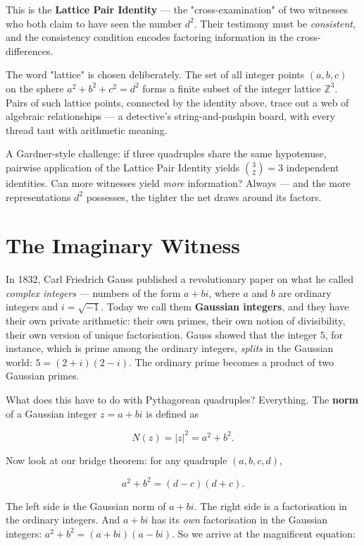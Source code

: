 \documentclass[11pt,twoside,openright]{book}
\theoremstyle{definition}
\theoremstyle{remark}
\begin{document}
This is the \textbf{Lattice Pair Identity} --- the "cross-examination" of two witnesses who both claim to have seen the number $d^2$. Their testimony must be \textit{consistent}, and the consistency condition encodes factoring information in the cross-differences.

The word "lattice" is chosen deliberately. The set of all integer points $(a, b, c)$ on the sphere $a^2 + b^2 + c^2 = d^2$ forms a finite subset of the integer lattice $\mathbb{Z}^3$. Pairs of such lattice points, connected by the identity above, trace out a web of algebraic relationships --- a detective's string-and-pushpin board, with every thread taut with arithmetic meaning.

A Gardner-style challenge: if three quadruples share the same hypotenuse, pairwise application of the Lattice Pair Identity yields $\binom{3}{2} = 3$ independent identities. Can more witnesses yield \textit{more} information? Always --- and the more representations $d^2$ possesses, the tighter the net draws around its factors.



\section{The Imaginary Witness}

In 1832, Carl Friedrich Gauss published a revolutionary paper on what he called \textit{complex integers} --- numbers of the form $a + bi$, where $a$ and $b$ are ordinary integers and $i = \sqrt{-1}$. Today we call them \textbf{Gaussian integers}, and they have their own private arithmetic: their own primes, their own notion of divisibility, their own version of unique factorisation. Gauss showed that the integer $5$, for instance, which is prime among the ordinary integers, \textit{splits} in the Gaussian world: $5 = (2 + i)(2 - i)$. The ordinary prime becomes a product of two Gaussian primes.

What does this have to do with Pythagorean quadruples? Everything. The \textbf{norm} of a Gaussian integer $z = a + bi$ is defined as

\[N(z) = |z|^2 = a^2 + b^2.\]

Now look at our bridge theorem: for any quadruple $(a, b, c, d)$,

\[a^2 + b^2 = (d - c)(d + c).\]

The left side is the Gaussian norm of $a + bi$. The right side is a factorisation in the ordinary integers. And $a + bi$ has its \textit{own} factorisation in the Gaussian integers: $a^2 + b^2 = (a + bi)(a - bi)$. So we arrive at the magnificent equation:
\end{document}
